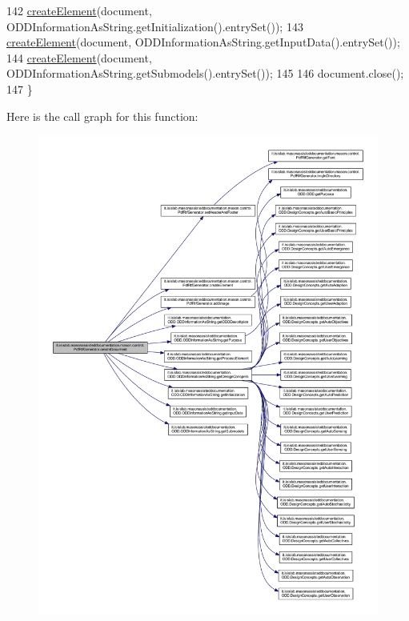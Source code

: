 \begin{DoxyCode}
142         \hyperlink{classit_1_1isislab_1_1masonassisteddocumentation_1_1mason_1_1control_1_1_pdf_rtf_generator_ad3127f275f1af4f9d92f314fb3f29f51}{createElement}(document, ODDInformationAsString.getInitialization().entrySet());
143         \hyperlink{classit_1_1isislab_1_1masonassisteddocumentation_1_1mason_1_1control_1_1_pdf_rtf_generator_ad3127f275f1af4f9d92f314fb3f29f51}{createElement}(document, ODDInformationAsString.getInputData().entrySet());
144         \hyperlink{classit_1_1isislab_1_1masonassisteddocumentation_1_1mason_1_1control_1_1_pdf_rtf_generator_ad3127f275f1af4f9d92f314fb3f29f51}{createElement}(document, ODDInformationAsString.getSubmodels().entrySet()); 
145         
146         document.close();
147     \}
\end{DoxyCode}


Here is the call graph for this function\-:
\nopagebreak
\begin{figure}[H]
\begin{center}
\leavevmode
\includegraphics[width=350pt]{classit_1_1isislab_1_1masonassisteddocumentation_1_1mason_1_1control_1_1_pdf_rtf_generator_add23c0e308cdf54a3c1e3a8128ea29ed_cgraph}
\end{center}
\end{figure}





